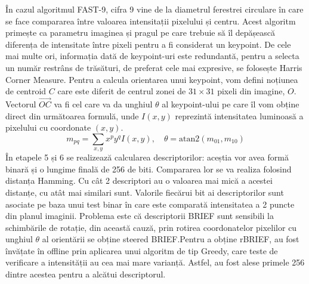 \documentclass[12pt,a4paper]{report}
\begin{document}
În cazul algoritmul FAST-9, 
cifra 9 vine de la diametrul ferestrei circulare în care se face compararea între valoarea 
intensitații pixelului și centru. Acest algoritm primește ca parametru imaginea și pragul 
pe care trebuie să îl depășească diferența de intensitate între pixeli pentru a fi considerat
un keypoint. De cele mai multe ori, informația dată de keypoint-uri este redundantă, pentru
a selecta un număr restrâns de trăsături, de preferat cele mai expresive, se folosește Harris
Corner Measure. Pentru a calcula orientarea unui keypoint, vom defini noțiunea de centroid  $ C $ 
care este diferit de centrul zonei de $ 31 \times 31 $ pixeli din imagine, $ O $. Vectorul $ \vec{OC} $ va fi cel 
care va da unghiul $ \theta $ al keypoint-ului pe care îl vom obține direct din următoarea 
formulă, unde $ I(x, y) $ reprezintă intensitatea luminoasă a pixelului cu coordonate $ (x, y) $.      
\begin{equation}
m_{pq} = \sum_{x, y} x^p y^q I(x, y), \quad{}
\theta = \text{atan2}(m_{01}, m_{10})
\end{equation}
În etapele 5 și 6 se realizează calcularea descriptorilor: aceștia vor avea formă binară și o 
lungime finală de 256 de biti. Compararea lor se va realiza folosind distanța Hamming. Cu cât 
2 descriptori au o valoarea mai mică a acestei distanțe, cu atât mai similari sunt. Valorile 
fiecărui bit ai descriptorilor sunt asociate pe baza unui test binar în care este comparată intensitatea a 2 
puncte din planul imaginii. Problema este că descriptorii BRIEF sunt sensibili la schimbările de
rotație, din această cauză, prin rotirea coordonatelor pixelilor cu unghiul $ \theta $ al 
orientării se obține steered BRIEF.\@ Pentru a obține rBRIEF, au fost învățate în offline prin
aplicarea unui algoritm de tip Greedy, care teste de verificare a intensității au cea mai mare 
varianță. Astfel, au fost alese primele 256 dintre acestea pentru a alcătui descriptorul.       
\end{document}
